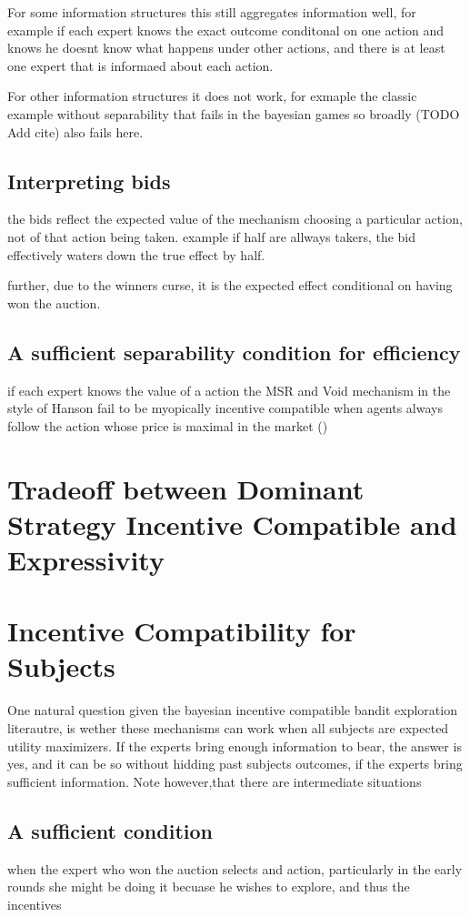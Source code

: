For some information structures this still aggregates information well, for example if each expert knows the exact outcome conditonal on one action and knows he doesnt know what happens under other actions, and there is at least one expert that is informaed about each action.

For other information structures it does not work, for exmaple the classic example without separability that fails in the bayesian games so broadly (TODO Add cite) also fails here. 

\subsection{Interpreting bids}

the bids reflect the expected value of the mechanism choosing a particular action, not of that action being taken. example if half are allways takers, the bid effectively waters down the true effect by half.

further, due to the winners curse, it is the expected effect conditional on having won the auction. 

\subsection{A sufficient separability condition for efficiency}

if each expert knows the value of a action the MSR and Void mechanism in the style of Hanson fail to be myopically incentive compatible when agents always follow the action whose price is maximal in the market (\cite{othman2010decision})



\section{Tradeoff between Dominant Strategy Incentive Compatible and Expressivity}



\section{Incentive Compatibility for Subjects}

One natural question given the bayesian incentive compatible bandit exploration literautre, is wether these mechanisms can work when all subjects are expected utility maximizers. If the experts bring enough information to bear, the answer is yes, and it can be so without hidding past subjects outcomes, if the experts bring sufficient information. Note however,that there are intermediate situations 

\subsection{A sufficient condition}

when the expert who won the auction selects and action, particularly in the early rounds she might be doing it becuase he wishes to explore, and thus the incentives 


